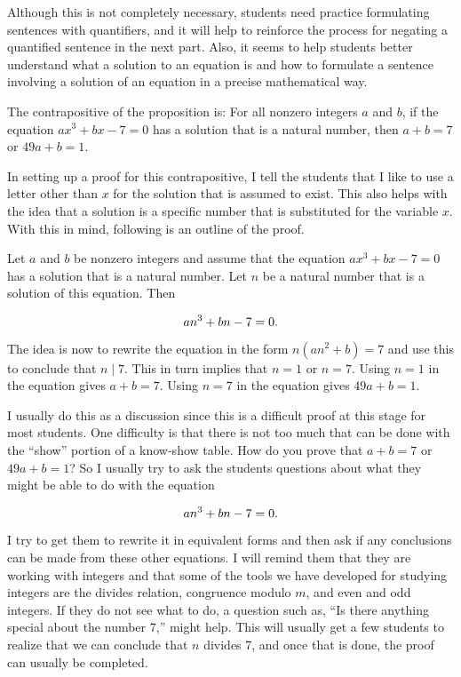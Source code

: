Although this is not completely necessary, students need practice formulating sentences with quantifiers, and it will help to reinforce the process for negating a quantified sentence in the next part.  Also, it seems to help students better understand what a solution to an equation is and how to formulate a sentence involving a solution of an equation in a precise mathematical way.

The contrapositive of the proposition is:  For all nonzero integers $a$ and $b$, if the equation 
$ax^3 + bx - 7 = 0$ has a solution that is a natural number, then $a + b = 7$ or $49a + b = 1$.

In setting up a proof for this contrapositive, I tell the students that I like to use a letter other than $x$ for the solution that is assumed to exist.  This also helps with the idea that a solution is a specific number that is substituted for the variable $x$.  With this in mind, following is an outline of the proof.

Let $a$ and $b$ be nonzero integers and assume that the equation $ax^3 + bx - 7 = 0$ has a solution that is a natural number.  Let $n$ be a natural number that is a solution of this equation.  Then

\begin{equation} \notag
an^3 + bn - 7 = 0.
\end{equation}

The idea is now to rewrite the equation in the form $n \left(an^2 + b \right) = 7$ and use this to conclude that $n \mid 7$.  This in turn implies that $n = 1$ or $n = 7$.  Using $n = 1$ in the equation gives $a + b = 7$.  Using $n = 7$ in the equation gives $49a + b = 1$.

\vskip6pt
I usually do this as a discussion since this is a difficult proof at this stage for most students.  One difficulty is that there is not too much that can be done with the ``show'' portion of a 
know-show table.  How do you prove that $a + b = 7$ or $49a + b = 1$?  So I usually try to ask the students questions about what they might be able to do with the equation

\begin{equation} \notag
an^3 + bn - 7 = 0.
\end{equation}

I try to get them to rewrite it in equivalent forms and then ask if any conclusions can be made from these other equations.  I will remind them that they are working with integers and that some of the tools we have developed for studying integers are the divides relation, congruence modulo $m$, and even and odd integers.  If they do not see what to do, a question such as, ``Is there anything special about the number 7,'' might help.  This will usually get a few students to realize that we can conclude that $n$ divides 7, and once that is done, the proof can usually be completed.


